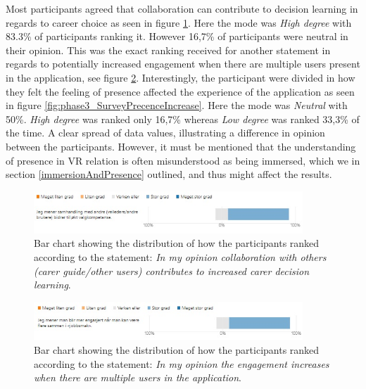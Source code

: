 Most participants agreed that collaboration can contribute to decision learning in regards to career choice as seen in figure \ref{fig:phase3_SurveyCollaborationIncreased}. Here the mode was \textit{High degree} with 83.3\% of participants ranking it. However 16,7\% of participants were neutral in their opinion. This was the exact ranking received for another statement in regards to potentially increased engagement when there are multiple users present in the application, see figure \ref{fig:phase3_SurveyEngagementIncreased}. Interestingly, the participant were divided in how they felt the feeling of presence affected the experience of the application as seen in figure \ref{fig:phase3_SurveyPrecenceIncrease}. Here the mode was \textit{Neutral} with 50\%. \textit{High degree} was ranked only 16,7\% whereas \textit{Low degree} was ranked 33,3\% of the time. A clear spread of data values, illustrating a difference in opinion between the participants. However, it must be mentioned that the understanding of presence in VR relation is often misunderstood as being immersed, which we in section \ref{immersionAndPresence} outlined, and thus might affect the results.       


\begin{figure}[H]
  \centering
   \captionsetup{width=.8\linewidth}
    \includegraphics[width=0.9\textwidth]{fig/phase_3/survey/ValgKompAppSamhandlingOkt.jpg}
 \caption{Bar chart showing the distribution of how the participants ranked according to the statement: \textit{In my opinion collaboration with others (carer guide/other users) contributes to increased carer decision learning}.}
\label{fig:phase3_SurveyCollaborationIncreased}
\end{figure}

\begin{figure}[H]
  \centering
   \captionsetup{width=.8\linewidth}
    \includegraphics[width=0.9\textwidth]{fig/phase_3/survey/ValgKompAppEngasjement.jpg}
 \caption{Bar chart showing the distribution of how the participants ranked according to the statement: \textit{In my opinion the engagement increases when there are multiple users in the application}.}
\label{fig:phase3_SurveyEngagementIncreased}
\end{figure}


